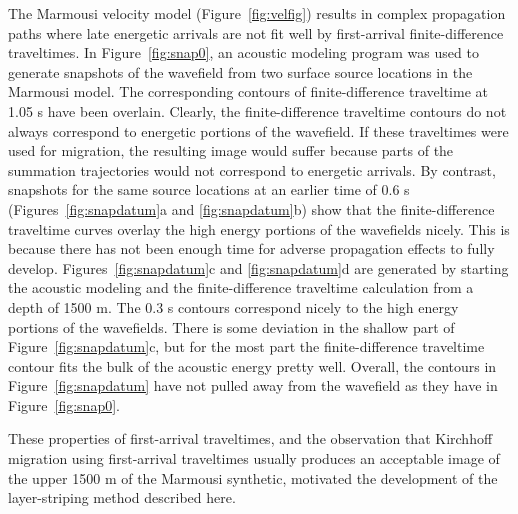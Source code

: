 The Marmousi velocity model (Figure~\ref{fig:velfig}) results in
complex propagation paths where late energetic arrivals are not fit well 
by first-arrival finite-difference traveltimes.
In Figure~\ref{fig:snap0},
an acoustic modeling program was used to generate snapshots of 
the wavefield from two surface source locations in the Marmousi model.
The corresponding
contours of finite-difference traveltime at 1.05 s have been overlain.
Clearly, the finite-difference traveltime contours do not always correspond
to energetic portions of the wavefield. If these traveltimes were
used for migration, the resulting image would suffer because 
parts of the summation trajectories would not correspond to 
energetic arrivals. By contrast, snapshots for the same source locations
at an earlier time of 0.6 s (Figures~\ref{fig:snapdatum}a and \ref{fig:snapdatum}b)
show that the finite-difference traveltime curves overlay the
high energy portions of the wavefields nicely. This is because there 
has not been enough time for adverse propagation effects to fully develop.
Figures~\ref{fig:snapdatum}c and \ref{fig:snapdatum}d are generated by
starting the acoustic modeling and the finite-difference traveltime
calculation from a depth of 1500 m. The 0.3 s contours correspond nicely
to the high energy portions of the wavefields. There is some deviation
in the shallow part of Figure~\ref{fig:snapdatum}c, but for the most part
the finite-difference traveltime contour fits the bulk of the acoustic 
energy pretty well. Overall, the contours in Figure~\ref{fig:snapdatum}
have not pulled away from the wavefield as they have in Figure~\ref{fig:snap0}.



These properties of first-arrival traveltimes, and the observation that
Kirchhoff migration using first-arrival traveltimes usually produces an
acceptable image of the upper 1500 m of the Marmousi synthetic, 
motivated the development of the layer-striping method described here.

